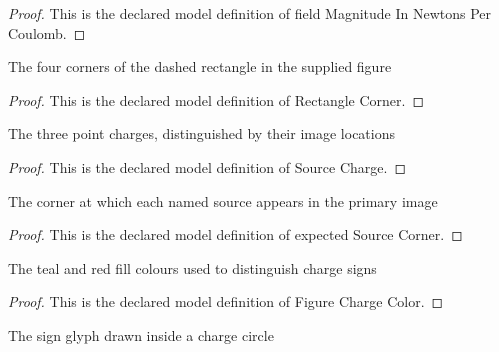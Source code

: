 \begin{proof}
  This is the declared model definition of field Magnitude In Newtons Per Coulomb.
\end{proof}
\begin{definition}
  \label{def:physics:phyx-mini-0834:phyxminiproblems-problemphyxmini0834-rectanglecorner}
  The four corners of the dashed rectangle in the supplied figure
\end{definition}
\begin{proof}
  This is the declared model definition of Rectangle Corner.
\end{proof}
\begin{definition}
  \label{def:physics:phyx-mini-0834:phyxminiproblems-problemphyxmini0834-sourcecharge}
  The three point charges, distinguished by their image locations
\end{definition}
\begin{proof}
  This is the declared model definition of Source Charge.
\end{proof}
\begin{definition}
  \label{def:physics:phyx-mini-0834:phyxminiproblems-problemphyxmini0834-expectedsourcecorner}
  The corner at which each named source appears in the primary image
\end{definition}
\begin{proof}
  This is the declared model definition of expected Source Corner.
\end{proof}
\begin{definition}
  \label{def:physics:phyx-mini-0834:phyxminiproblems-problemphyxmini0834-figurechargecolor}
  The teal and red fill colours used to distinguish charge signs
\end{definition}
\begin{proof}
  This is the declared model definition of Figure Charge Color.
\end{proof}
\begin{definition}
  \label{def:physics:phyx-mini-0834:phyxminiproblems-problemphyxmini0834-figurechargesign}
  The sign glyph drawn inside a charge circle
\end{definition}

